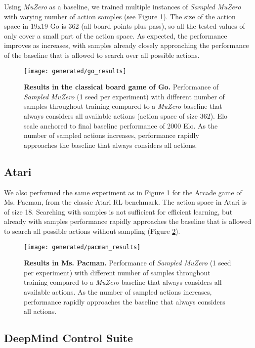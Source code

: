 \documentclass{article}
\newcommand{\muzero}{\emph{MuZero}}
\newcommand{\smuzero}{\emph{Sampled MuZero}}
\newcommand{\dmcs}{DeepMind Control Suite }
\begin{document}
Using \muzero{} as a baseline, we trained multiple instances of \smuzero{} with varying number of action samples  (see Figure \ref{fig:go-results}). The size of the action space in 19x19 Go is 362 (all board points plus pass), so all the tested values of  only cover a small part of the action space. As expected, the performance improves as  increases, with  samples already closely approaching the performance of the baseline that is allowed to search over all possible actions.

\begin{figure}
\texttt{[image: generated/go\_results]}
\vspace*{-7mm}
\caption[]{
\label{fig:go-results}
\textbf{Results in the classical board game of Go.} Performance of \smuzero{} (1 seed per experiment) with different number  of samples throughout training compared to a \muzero{} baseline that always considers all available actions (action space of size 362). Elo scale anchored to final baseline performance of 2000 Elo. As the number of sampled actions increases, performance rapidly approaches the baseline that always considers all actions.
}
\end{figure}

\subsection{Atari}
We also performed the same experiment as in Figure \ref{fig:go-results} for the Arcade game of Ms. Pacman, from the classic Atari RL benchmark. The action space in Atari is of size 18. Searching with  samples is not sufficient for efficient learning, but already with  samples performance rapidly approaches the baseline that is allowed to search all possible actions without sampling (Figure \ref{fig:pacman-results}).

\begin{figure}
\texttt{[image: generated/pacman\_results]}
\vspace*{-7mm}
\caption[]{
\label{fig:pacman-results}
\textbf{Results in Ms. Pacman.} Performance of \smuzero{} (1 seed per experiment) with different number of samples throughout training compared to a \muzero{} baseline that always considers all available actions. As the number of sampled actions increases, performance rapidly approaches the baseline that always considers all actions.
}
\end{figure}

\subsection{\dmcs}
\end{document}
